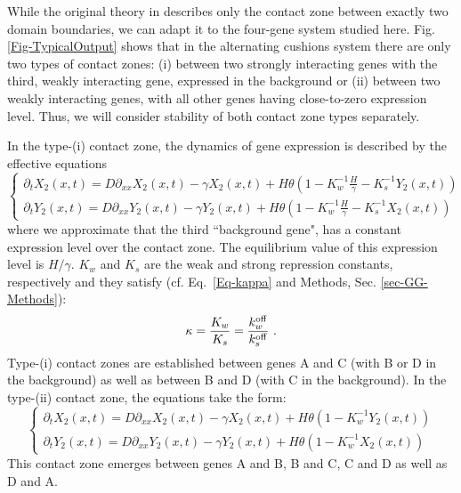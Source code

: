 \documentclass[a4paper,10pt]{article}
\begin{document}
While the original theory in \cite{Majka2023} describes only the contact zone between exactly two domain boundaries, we can adapt it to the four-gene system studied here. Fig. \ref{Fig-TypicalOutput} shows that in the alternating cushions system there are only two types of contact zones: (i) between two strongly interacting genes with the third, weakly interacting gene, expressed in the background or (ii) between two weakly interacting genes, with all other genes having close-to-zero expression level. Thus, we will consider stability of both contact zone types separately.

In the type-(i) contact zone, the dynamics of gene expression is described by the effective equations
\begin{equation}
\left\{
\begin{gathered}
\partial_t X_2(x,t)= D\partial_{xx} X_2(x,t)-\gamma X_2(x,t)+H \theta\left(1-K_w^{-1}\frac{H}{\gamma}-K_{s}^{-1} Y_2(x,t) \right) \\
\partial_t Y_2(x,t)= D\partial_{xx} Y_2(x,t)-\gamma Y_2(x,t)+H \theta\left(1-K_w^{-1}\frac{H}{\gamma} -K_{s}^{-1} X_2(x,t) \right)
\end{gathered}\right.
\end{equation}
where we approximate that the third ``background gene", has a constant expression level over the contact zone. The equilibrium value of this expression level is $H/\gamma$. $K_w$ and $K_s$ are the weak and strong repression constants, respectively and they satisfy (cf. Eq.~\ref{Eq-kappa} and Methods, Sec. \ref{sec-GG-Methods}):
\begin{equation}
\kappa=\frac{K_w}{K_s}=\frac{k_w^{\rm off}}{k_s^{\rm off}} ~.
\end{equation}
Type-(i) contact zones are established between genes A and C (with B or D in the background) as well as between B and D (with C in the background). In the type-(ii) contact zone, the equations take the form:
\begin{equation}
\left\{
\begin{gathered}
\partial_t X_2(x,t)= D\partial_{xx} X_2(x,t)-\gamma X_2(x,t)+H \theta\left(1-K_{w}^{-1} Y_2(x,t) \right) \\
\partial_t Y_2(x,t)= D\partial_{xx} Y_2(x,t)-\gamma Y_2(x,t)+H \theta\left(1 -K_{w}^{-1} X_2(x,t) \right)
\end{gathered}\right.
\end{equation}
This contact zone emerges between genes A and B, B and C, C and D as well as D and A. 
\end{document}
